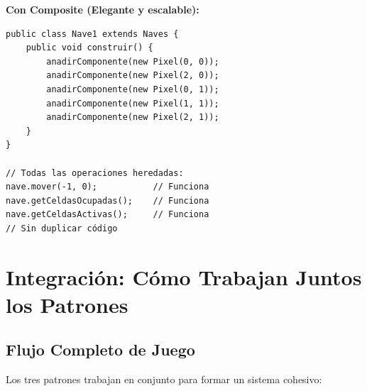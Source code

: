 \documentclass[12pt]{article}
\begin{document}
\textbf{Con Composite (Elegante y escalable):}

\begin{lstlisting}
public class Nave1 extends Naves {
    public void construir() {
        anadirComponente(new Pixel(0, 0));
        anadirComponente(new Pixel(2, 0));
        anadirComponente(new Pixel(0, 1));
        anadirComponente(new Pixel(1, 1));
        anadirComponente(new Pixel(2, 1));
    }
}

// Todas las operaciones heredadas:
nave.mover(-1, 0);           // Funciona
nave.getCeldasOcupadas();    // Funciona
nave.getCeldasActivas();     // Funciona
// Sin duplicar código
\end{lstlisting}

\newpage
\section{Integración: Cómo Trabajan Juntos los Patrones}

\subsection{Flujo Completo de Juego}

Los tres patrones trabajan en conjunto para formar un sistema cohesivo:
\end{document}
